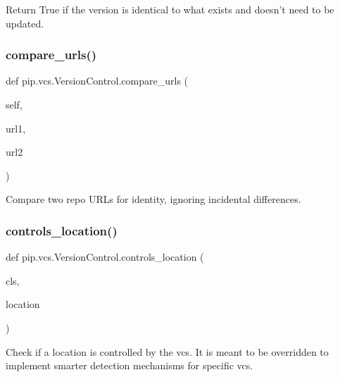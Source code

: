 \begin{DoxyVerb}Return True if the version is identical to what exists and
doesn't need to be updated.
\end{DoxyVerb}
 \mbox{\label{classpip_1_1vcs_1_1_version_control_a1ffc1f50c911a7e8a7291a5987122ccc}} 
\subsubsection{\texorpdfstring{compare\+\_\+urls()}{compare\_urls()}}
{\footnotesize\ttfamily def pip.\+vcs.\+Version\+Control.\+compare\+\_\+urls (\begin{DoxyParamCaption}\item[{}]{self,  }\item[{}]{url1,  }\item[{}]{url2 }\end{DoxyParamCaption})}

\begin{DoxyVerb}Compare two repo URLs for identity, ignoring incidental differences.
\end{DoxyVerb}
 \mbox{\label{classpip_1_1vcs_1_1_version_control_a8b5a21faac927f865446fd09e7791dca}} 
\subsubsection{\texorpdfstring{controls\+\_\+location()}{controls\_location()}}
{\footnotesize\ttfamily def pip.\+vcs.\+Version\+Control.\+controls\+\_\+location (\begin{DoxyParamCaption}\item[{}]{cls,  }\item[{}]{location }\end{DoxyParamCaption})}

\begin{DoxyVerb}Check if a location is controlled by the vcs.
It is meant to be overridden to implement smarter detection
mechanisms for specific vcs.
\end{DoxyVerb}
 \mbox{\label{classpip_1_1vcs_1_1_version_control_a342a59cf20ab9a1b3016c9ba58bfa90e}} 
